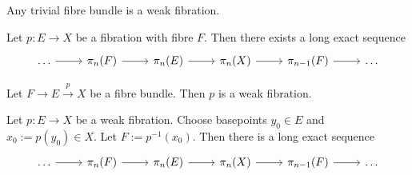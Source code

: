 \begin{lemma}
	Any trivial fibre bundle is a weak fibration.
\end{lemma}

\begin{theorem}
	Let $p : E \to X$ be a fibration with fibre $F$. Then there exists a long exact sequence
	\begin{equation*}
		\begin{tikzcd}
			\dots \arrow[r] & \pi_n(F) \arrow[r] & \pi_n(E) \arrow[r] & \pi_n(X) \arrow[r] & \pi_{n - 1}(F) \arrow[r] & \dots
		\end{tikzcd}
	\end{equation*}
\end{theorem}

\begin{corollary}
	Let $F \to E \overset{p}{\to} X$ be a fibre bundle. Then $p$ is a weak fibration.
\end{corollary}

\begin{corollary}
	Let $p : E \to X$ be a weak fibration. Choose basepoints $y_0 \in E$ and $x_0 := p(y_0) \in X$. Let $F := p^{-1}(x_0)$. Then there is a long exact sequence
	\begin{equation*}
		\begin{tikzcd}
			\dots \arrow[r] & \pi_n(F) \arrow[r] & \pi_n(E) \arrow[r] & \pi_n(X) \arrow[r] & \pi_{n - 1}(F) \arrow[r] & \dots
		\end{tikzcd}
	\end{equation*}
\end{corollary}

\printbibliography


